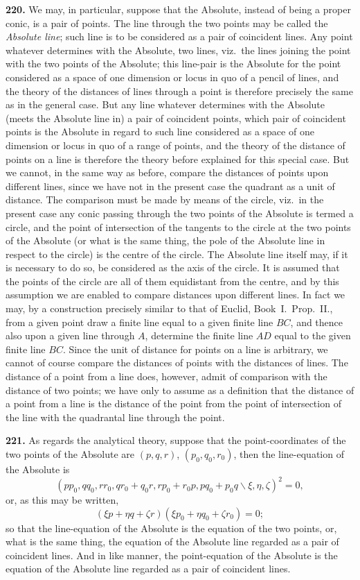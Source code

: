 \documentclass[11pt,a4paper]{article}
\begin{document}
\textbf{220.} We may, in particular, suppose that the Absolute, instead of being a proper
conic, is a pair of points. The line through the two points may be called the \textit{Absolute
line}; such line is to be considered as a pair of coincident lines. Any point whatever
determines with the Absolute, two lines, viz.\ the lines joining the point with the two
points of the Absolute; this line-pair is the Absolute for the point considered as a
space of one dimension or locus in quo of a pencil of lines, and the theory of the
distances of lines through a point is therefore precisely the same as in the general case.
But any line whatever determines with the Absolute (meets the Absolute line in) a
pair of coincident points, which pair of coincident points is the Absolute in regard to
such line considered as a space of one dimension or locus in quo of a range of points,
and the theory of the distance of points on a line is therefore the theory before
explained for this special case. But we cannot, in the same way as before, compare
the distances of points upon different lines, since we have not in the present case the
quadrant as a unit of distance. The comparison must be made by means of the circle,
viz.\ in the present case any conic passing through the two points of the Absolute is
termed a circle, and the point of intersection of the tangents to the circle at the two
points of the Absolute (or what is the same thing, the pole of the Absolute line in
respect to the circle) is the centre of the circle. The Absolute line itself may, if it is
necessary to do so, be considered as the axis of the circle. It is assumed that the
points of the circle are all of them equidistant from the centre, and by this assumption
we are enabled to compare distances upon different lines. In fact we may, by a
construction precisely similar to that of Euclid, Book~I.\ Prop.~II., from a given point
draw a finite line equal to a given finite line $BC$, and thence also upon a given line
through $A$, determine the finite line $AD$ equal to the given finite line $BC$. Since the
unit of distance for points on a line is arbitrary, we cannot of course compare the
distances of points with the distances of lines. The distance of a point from a line
does, however, admit of comparison with the distance of two points; we have only to
assume as a definition that the distance of a point from a line is the distance of the
point from the point of intersection of the line with the quadrantal line through the
point.

\textbf{221.} As regards the analytical theory, suppose that the point-coordinates of the
two points of the Absolute are $(p,q,r)$, $(p_0,q_0,r_0)$, then the line-equation of the Absolute is
\[
(pp_0, qq_0, rr_0, qr_0+q_0r, rp_0+r_0p, pq_0+p_0q\!\backslash \xi,\eta,\zeta)^2 = 0,
\]
or, as this may be written,
\[
(\xi p+\eta q+\zeta r)(\xi p_0+\eta q_0+\zeta r_0) = 0;
\]
so that the line-equation of the Absolute is the equation of the two points, or, what
is the same thing, the equation of the Absolute line regarded as a pair of coincident
lines. And in like manner, the point-equation of the Absolute is the equation of the
Absolute line regarded as a pair of coincident lines.
\end{document}
